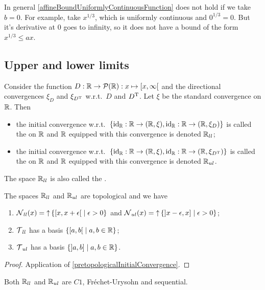 \begin{example}
In general \ref{affineBoundUniformlyContinuousFunction} does not hold if we take $b=0$. For example, take $x^{1/3}$, which is uniformly continuous and $0^{1/3} = 0$. But it's derivative at $0$ goes to infinity, so it does not have a bound of the form $x^{1/3} \leq ax$.
\end{example}

\subsection{Upper and lower limits}
\begin{definition}
Consider the function $D: \R \to\powerset(\R): x\mapsto \interval[co]{x,\infty}$ and the directional convergences $\xi_D$ and $\xi_{D^{\mathrm{T}}}$ w.r.t.\ $D$ and $D^{\mathrm{T}}$. Let $\xi$ be the standard convergence on $\mathbb{R}$.
Then
\begin{itemize}
\item the initial convergence w.r.t.\ $\{\id_\R: \R\to \sSet{\R,\xi}, \id_\R: \R\to \sSet{\R,\xi_D}\}$ is called the  on $\mathbb{R}$ and $\mathbb{R}$ equipped with this convergence is denoted $\mathbb{R}_{ll}$;
\item the initial convergence w.r.t.\ $\{\id_\R: \R\to \sSet{\R,\xi}, \id_\R: \R\to \sSet{\R,\xi_{D^\transp}}\}$ is called the  on $\mathbb{R}$ and $\mathbb{R}$ equipped with this convergence is denoted $\mathbb{R}_{ul}$.
\end{itemize}
The space $\mathbb{R}_{ll}$ is also called the .
\end{definition}

\begin{proposition}
The spaces $\mathbb{R}_{ll}$ and $\mathbb{R}_{ul}$ are topological and we have
\begin{enumerate}
\item $\neighbourhood_{ll}(x) = \upset \setbuilder{\interval[co]{x,x+\epsilon}}{\epsilon > 0}$ and $\neighbourhood_{ul}(x) = \upset \setbuilder{\interval[oc]{x-\epsilon, x}}{\epsilon > 0}$;
\item $\operatorname{\mathcal{T}}_{ll}$ has a basis $\setbuilder{\interval[co]{a,b}}{a,b\in \R}$;
\item $\operatorname{\mathcal{T}}_{ul}$ has a basis $\setbuilder{\interval[oc]{a,b}}{a,b\in \R}$.
\end{enumerate}
\end{proposition}
\begin{proof}
Application of \ref{pretopologicalInitialConvergence}.
\end{proof}
\begin{corollary} \label{SorgenfreyLineC1}
Both $\mathbb{R}_{ll}$ and $\mathbb{R}_{ul}$ are $C1$, Fréchet-Urysohn and sequential.
\end{corollary}

